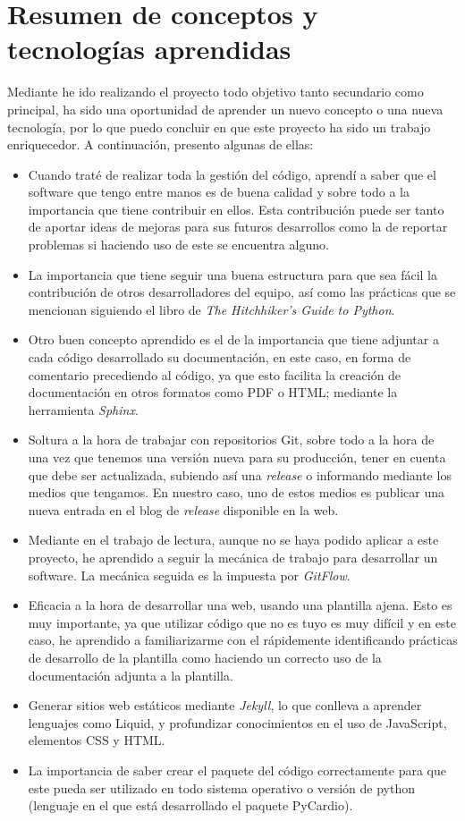\section{Resumen de conceptos y tecnologías aprendidas}
\label{sec:resumenTecn}

Mediante he ido realizando el proyecto todo objetivo tanto secundario como principal, ha sido una oportunidad de aprender un nuevo concepto o una nueva tecnología, por lo que puedo concluir en que este proyecto ha sido un trabajo enriquecedor. A continuación, presento algunas de ellas: 
\begin{itemize}
    \item Cuando traté de realizar toda la gestión del código, aprendí a saber que el software que tengo entre manos es de buena calidad y sobre todo a la importancia que tiene contribuir en ellos. Esta contribución puede ser tanto de aportar ideas de mejoras para sus futuros desarrollos como la de reportar problemas si haciendo uso de este se encuentra alguno.
    \item La importancia que tiene seguir una buena estructura para que sea fácil la contribución de otros desarrolladores del equipo, así como las prácticas que se mencionan siguiendo el libro de \emph{The Hitchhiker’s Guide to Python}\cite{pythonGuide}. 
    \item Otro buen concepto aprendido es el de la importancia que tiene adjuntar a cada código desarrollado su documentación, en este caso, en forma de comentario precediendo al código, ya que esto facilita la creación de documentación en otros formatos como PDF o HTML; mediante la herramienta \emph{Sphinx}.
    \item Soltura a la hora de trabajar con repositorios Git, sobre todo a la hora de una vez que tenemos una versión  nueva para su producción, tener en cuenta que debe ser actualizada, subiendo así una \emph{release} o informando mediante los medios que tengamos. En nuestro caso, uno de estos medios es publicar una nueva entrada en el blog de \emph{release} disponible en la web.
    \item Mediante en el trabajo de lectura, aunque no se haya podido aplicar a este proyecto, he aprendido a seguir la mecánica de trabajo para desarrollar un software. La mecánica seguida es la impuesta por \emph{GitFlow}.
    \item Eficacia a la hora de desarrollar una web, usando una plantilla ajena. Esto es muy importante, ya que utilizar código que no es tuyo es muy difícil y en este caso, he aprendido a familiarizarme con el rápidemente identificando prácticas de desarrollo de la plantilla como haciendo un correcto uso de la documentación adjunta a la plantilla.
    \item Generar sitios web estáticos mediante \emph{Jekyll}, lo que conlleva a aprender lenguajes como Liquid, y profundizar conocimientos en el uso de JavaScript, elementos CSS y HTML.
    \item La importancia de saber crear el paquete del código correctamente para que este pueda ser utilizado en todo sistema operativo o versión de python (lenguaje en el que está desarrollado el paquete PyCardio).
\end{itemize}


